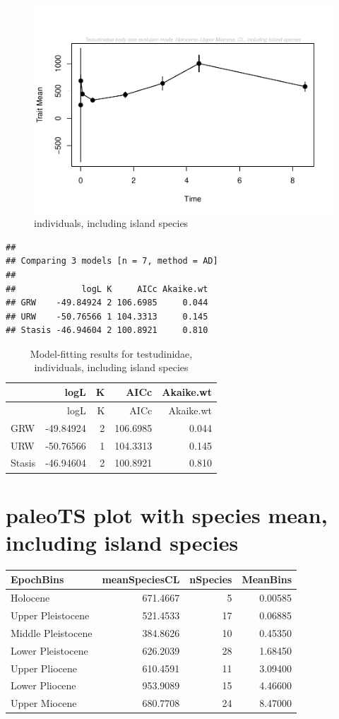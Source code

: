 \documentclass[]{article}
\begin{document}
\begin{figure}[htbp]
\centering
\includegraphics{MA_JJ_files/figure-latex/paleoTS plot-1.pdf}
\caption{individuals, including island species}
\end{figure}

\begin{verbatim}
## 
## Comparing 3 models [n = 7, method = AD]
## 
##             logL K     AICc Akaike.wt
## GRW    -49.84924 2 106.6985     0.044
## URW    -50.76566 1 104.3313     0.145
## Stasis -46.94604 2 100.8921     0.810
\end{verbatim}

\begin{longtable}[]{@{}lrrrr@{}}
\caption{Model-fitting results for testudinidae, individuals, including
island species}\tabularnewline
\toprule
& logL & K & AICc & Akaike.wt\tabularnewline
\midrule
\endfirsthead
\toprule
& logL & K & AICc & Akaike.wt\tabularnewline
\midrule
\endhead
GRW & -49.84924 & 2 & 106.6985 & 0.044\tabularnewline
URW & -50.76566 & 1 & 104.3313 & 0.145\tabularnewline
Stasis & -46.94604 & 2 & 100.8921 & 0.810\tabularnewline
\bottomrule
\end{longtable}

\section{paleoTS plot with species mean, including island
species}\label{paleots-plot-with-species-mean-including-island-species}

\begin{longtable}[]{@{}lrrr@{}}
\toprule
EpochBins & meanSpeciesCL & nSpecies & MeanBins\tabularnewline
\midrule
\endhead
Holocene & 671.4667 & 5 & 0.00585\tabularnewline
Upper Pleistocene & 521.4533 & 17 & 0.06885\tabularnewline
Middle Pleistocene & 384.8626 & 10 & 0.45350\tabularnewline
Lower Pleistocene & 626.2039 & 28 & 1.68450\tabularnewline
Upper Pliocene & 610.4591 & 11 & 3.09400\tabularnewline
Lower Pliocene & 953.9089 & 15 & 4.46600\tabularnewline
Upper Miocene & 680.7708 & 24 & 8.47000\tabularnewline
\bottomrule
\end{longtable}
\end{document}
